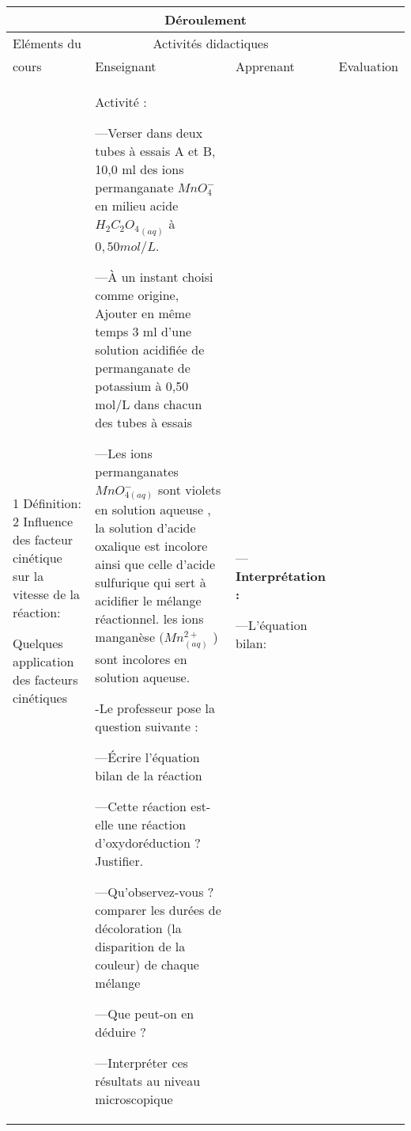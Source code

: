 \documentclass[12pt]{article}
\begin{document}

\begin{center}
	 \begin{tabular}{|p{}||p{}||p{}||p{}|}
\hline
\multicolumn{4}{|c|}{Déroulement}\\\hline
Eléments du & \multicolumn{2}{c||}{Activités didactiques} &  \\\cline{2-3}
cours & Enseignant & Apprenant & Evaluation\\\hline

\color{red}{III Les facteurs cinétiques}

\vspace{0.5cm}
\color{blue}1 Définition:
\vspace{0.5cm}
\color{blue}2 Influence des facteur cinétique sur la vitesse de la réaction:

\vspace{0.5cm}
\color{red} Quelques application des facteurs cinétiques	
	  &
Activité : 

---Verser dans deux tubes à essais A et B, 10,0 ml des ions permanganate $MnO^{-}_4$ en milieu acide ${H_2C_2O_4}_{(aq)}$ à $0,50 mol/L$.

---À un instant choisi comme origine,
Ajouter en même temps 3 ml d’une
solution acidifiée de permanganate de
potassium à 0,50 mol/L dans chacun des
tubes à essais


---Les ions permanganates $MnO^-_{4(aq)}$ sont violets en solution aqueuse , la solution d’acide oxalique
est incolore ainsi que celle d’acide sulfurique qui sert à acidifier le mélange réactionnel. les ions manganèse $( Mn^{2+}_{(aq)}$ ) sont incolores en solution aqueuse.

\vspace{0.2cm}
-Le professeur pose la question suivante : 


---Écrire l’équation bilan de la réaction 

---Cette réaction est-elle une réaction d'oxydoréduction ? Justifier.

---Qu’observez-vous ? comparer les durées de décoloration (la disparition de la couleur) de chaque mélange

---Que peut-on en déduire ?

---Interpréter ces résultats au niveau microscopique

				  &

---\textbf{Interprétation : }


---L’équation bilan: 


\end{tabular}
\end{center}
\end{document}
